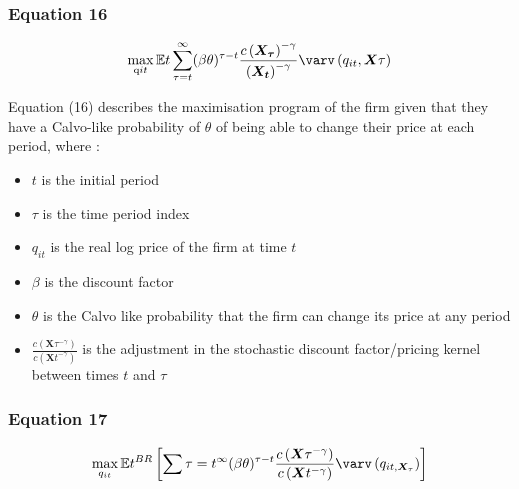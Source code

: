 \documentclass{article}
\begin{document}
\subsubsection*{Equation 16}
\begin{equation}
\max_{\text{q}{it}} \mathbb{E}{t} \sum_{\tau=t}^{\infty}(\beta\theta)^{\tau-t} \frac{c\left(\bm{X_{\tau}}\right)^{-\gamma}}{\left(\bm{X_{t}}\right)^{-\gamma}} \varv\left(q_{it},\bm{X}{\tau}\right)
\end{equation}

Equation (16) describes the maximisation program of the firm given that they have a Calvo-like probability of $\theta$ of being able to change their price at each period, where : 

\begin{itemize}
    \item $t$ is the initial period 
    \item $\tau$ is the time period index  
    \item $q_{it}$ is the real log price of the firm at time $t$
    \item $\beta$ is the discount factor
    \item $\theta$ is the Calvo like probability that the firm can change its price at any period
    \item $\frac{c\left(\bm{X}{\tau}^{-\gamma}\right)}{c\left(\bm{X}{t}^{-\gamma}\right)}$ is the adjustment in the stochastic discount factor/pricing kernel between times $t$ and $\tau$ 
\end{itemize}

\subsubsection*{Equation 17}
\begin{equation}
    \max_{q_{it}}{\mathbb{E}{t}^{BR} \left[\sum{\tau=t}^{\infty}(\beta\theta)^{\tau-t}\frac{c\left(\bm{X}{\tau}^{-\gamma}\right)}{c\left(\bm{X}{t}^{-\gamma}\right)} \varv\left(q_{it,\bm{X}_{\tau}}\right) \right]}
\end{equation}
\end{document}
